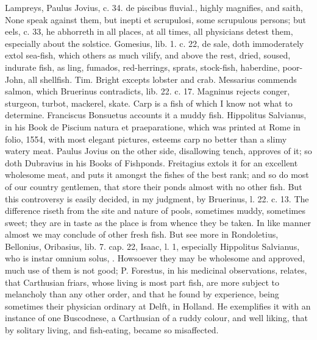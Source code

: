 {Lampreys, Paulus Jovius, c. 34. de piscibus fluvial., highly magnifies,
and saith, None speak against them, but inepti et scrupulosi, some
scrupulous persons; but eels, c. 33, he abhorreth in all places,
at all times, all physicians detest them, especially about the
solstice. Gomesius, lib. 1. c. 22, de sale, doth immoderately extol
sea-fish, which others as much vilify, and above the rest, dried,
soused, indurate fish, as ling, fumados, red-herrings, sprats,
stock-fish, haberdine, poor-John, all shellfish. Tim. Bright
excepts lobster and crab. Messarius commends salmon, which Bruerinus
contradicts, lib. 22. c. 17. Magninus rejects conger, sturgeon, turbot,
mackerel, skate.
Carp is a fish of which I know not what to determine. Franciscus
Bonsuetus accounts it a muddy fish. Hippolitus Salvianus, in his Book
de Piscium natura et praeparatione, which was printed at Rome in folio,
1554, with most elegant pictures, esteems carp no better than a slimy
watery meat. Paulus Jovius on the other side, disallowing tench,
approves of it; so doth Dubravius in his Books of Fishponds. Freitagius
extols it for an excellent wholesome meat, and puts it amongst
the fishes of the best rank; and so do most of our country gentlemen,
that store their ponds almost with no other fish. But this controversy
is easily decided, in my judgment, by Bruerinus, l. 22. c. 13. The
difference riseth from the site and nature of pools, sometimes
muddy, sometimes sweet; they are in taste as the place is from whence
they be taken. In like manner almost we may conclude of other fresh
fish. But see more in Rondoletius, Bellonius, Oribasius, lib. 7. cap.
22, Isaac, l. 1, especially Hippolitus Salvianus, who is instar omnium
solus, \etc{}. Howsoever they may be wholesome and approved, much use of
them is not good; P. Forestus, in his medicinal observations,
relates, that Carthusian friars, whose living is most part fish,
are more subject to melancholy than any other order, and that he found
by experience, being sometimes their physician ordinary at Delft, in
Holland. He exemplifies it with an instance of one Buscodnese, a
Carthusian of a ruddy colour, and well liking, that by solitary living,
and fish-eating, became so misaffected.
}

